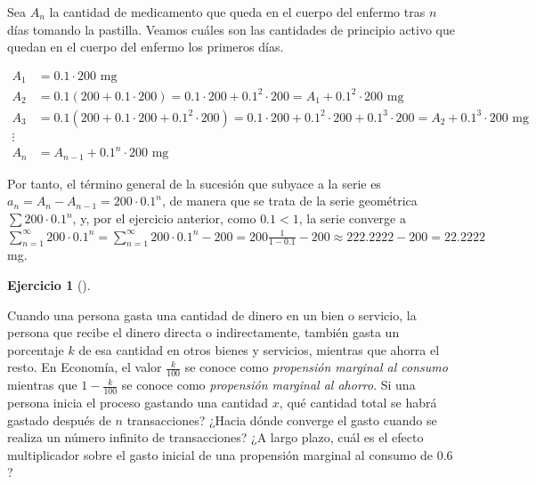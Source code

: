 \documentclass[
  a4paper,
]{scrreport}
\theoremstyle{definition}
\newtheorem{exercise}{Ejercicio}[chapter]
\theoremstyle{remark}
\begin{document}
\begin{tcolorbox}[enhanced jigsaw, coltitle=black, toptitle=1mm, colframe=quarto-callout-tip-color-frame, colbacktitle=quarto-callout-tip-color!10!white, breakable, opacityback=0, bottomtitle=1mm, opacitybacktitle=0.6, title=\textcolor{quarto-callout-tip-color}{\faLightbulb}\hspace{0.5em}{Solución}, arc=.35mm, leftrule=.75mm, toprule=.15mm, titlerule=0mm, bottomrule=.15mm, left=2mm, rightrule=.15mm, colback=white]

Sea \(A_n\) la cantidad de medicamento que queda en el cuerpo del
enfermo tras \(n\) días tomando la pastilla. Veamos cuáles son las
cantidades de principio activo que quedan en el cuerpo del enfermo los
primeros días.

\begin{align*}
A_1 &= 0.1\cdot 200 \mbox{ mg}\\ 
A_2 &= 0.1 (200 + 0.1\cdot 200) = 0.1\cdot 200 + 0.1^2 \cdot 200 = A_1 + 0.1^2\cdot 200 \mbox{ mg}\\ 
A_3 &= 0.1 (200 + 0.1\cdot 200 + 0.1^2 \cdot 200) = 0.1\cdot 200 + 0.1^2 \cdot 200 + 0.1^3\cdot 200 = A_2 + 0.1^3\cdot 200 \mbox{ mg}\\ 
\vdots\\
A_n &= A_{n-1} + 0.1^n \cdot 200 \mbox{ mg}
\end{align*}

Por tanto, el término general de la sucesión que subyace a la serie es
\(a_n = A_n-A_{n-1} = 200\cdot 0.1^n\), de manera que se trata de la
serie geométrica \(\sum 200\cdot 0.1^n\), y, por el ejercicio anterior,
como \(0.1<1\), la serie converge a
\(\sum_{n=1}^\infty 200\cdot 0.1^n = \sum_{n=1}^\infty 200\cdot 0.1^n - 200 = 200\frac{1}{1-0.1} - 200 \approx 222.2222 - 200 = 22.2222\)
mg.

\end{tcolorbox}

\begin{exercise}[]\protect\hypertarget{exr-propensiones-marginales-gasto-ahorro}{}\label{exr-propensiones-marginales-gasto-ahorro}

Cuando una persona gasta una cantidad de dinero en un bien o servicio,
la persona que recibe el dinero directa o indirectamente, también gasta
un porcentaje \(k\) de esa cantidad en otros bienes y servicios,
mientras que ahorra el resto. En Economía, el valor \(\frac{k}{100}\) se
conoce como \emph{propensión marginal al consumo} mientras que
\(1-\frac{k}{100}\) se conoce como \emph{propensión marginal al ahorro}.
Si una persona inicia el proceso gastando una cantidad \(x\), qué
cantidad total se habrá gastado después de \(n\) transacciones? ¿Hacia
dónde converge el gasto cuando se realiza un número infinito de
transacciones? ¿A largo plazo, cuál es el efecto multiplicador sobre el
gasto inicial de una propensión marginal al consumo de \(0.6\)?

\end{exercise}
\end{document}
